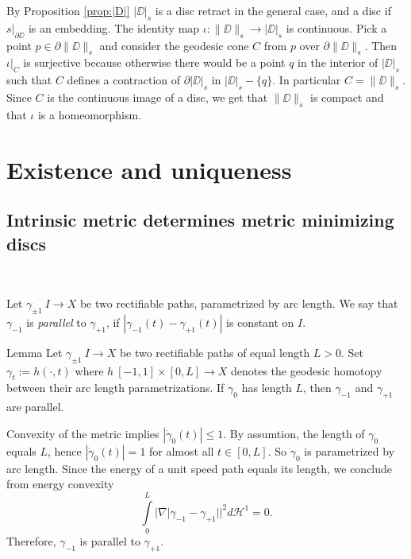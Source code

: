 \documentclass[a4paper,10pt]{amsart}
\begin{document}
By Proposition \ref{prop:|D|} $|\DD|_s$ is a disc retract in the general case, and a disc if $s|_{\partial\DD}$ is an embedding.
The identity map $\iota:\|\DD\|_s\to |\DD|_s$ is continuous. Pick a point $p\in\partial\|\DD\|_s$ and consider the geodesic 
cone $C$ from $p$ over $\partial\|\DD\|_s$. Then $\iota|_C$ is surjective because otherwise there would be a point $q$ in the 
interior of $|\DD|_s$ such that $C$ defines a contraction of $\partial|\DD|_s$ in $|\DD|_s-\{q\}$. In particular $C=\|\DD\|_s$.
Since $C$ is the continuous image of a disc, we get that $\|\DD\|_s$ is compact and that $\iota$ is a homeomorphism.
\qeds













\section{Existence and uniqueness}




\subsection{Intrinsic metric determines metric minimizing discs}~

\medskip
Let $\gamma_{\pm 1}\:I\to X$ be two rectifiable paths, parametrized by arc length. We say that  $\gamma_{-1}$ is {\em parallel} to $\gamma_{+1}$, if $|\gamma_{-1}(t)-\gamma_{+1}(t)|$
is constant on $I$.


\begin{thm}{Lemma}\label{lem:parpaths}
Let $\gamma_{\pm 1}\:I\to X$ be two rectifiable paths of equal length $L>0$. Set $\gamma_t:=h(\cdot,t)$ where $h\:[-1,1]\times[0,L]\to X$ denotes the geodesic homotopy
between their arc length parametrizations. If $\gamma_0$ has length $L$, then $\gamma_{-1}$ and $\gamma_{+1}$ are parallel. 
\end{thm}
Convexity of the metric implies $|\dot\gamma_0(t)|\leq 1$. By assumtion, the length of $\gamma_0$ equals $L$, hence $|\dot\gamma_0(t)|=1$ for almost all $t\in[0,L]$. So $\gamma_0$
is parametrized by arc length. Since the energy of a unit speed path equals its length, we conclude from energy convexity 
$$
\int\limits_0^L|\nabla |\gamma_{-1}-\gamma_{+1}||^2 d\mathcal{H}^1
=
0.
$$
Therefore, $\gamma_{-1}$ is parallel to $\gamma_{+1}$.
\qeds
\end{document}
